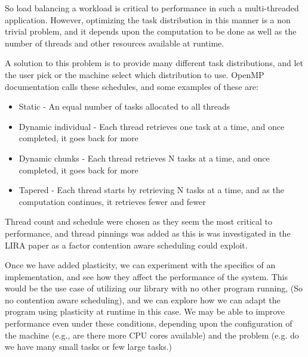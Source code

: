 So load balancing a workload is critical to performance in such a multi-threaded application. However, optimizing the task distribution in this manner is a non trivial problem, and it depends upon the computation to be done as well as the number of threads and other resources available at runtime.

A solution to this problem is to provide many different task distributions, and let the user pick or the machine select which distribution to use. OpenMP documentation calls these schedules, and some examples of these are:

\begin{itemize}
	\item Static - An equal number of tasks allocated to all threads
	\item Dynamic individual - Each thread retrieves one task at a time, and once completed, it goes back for more
	\item Dynamic chunks - Each thread retrieves N tasks at a time, and once completed, it goes back for more
	\item Tapered - Each thread starts by retrieving N tasks at a time, and as the computation continues, it retrieves fewer and fewer
\end{itemize}

Thread count and schedule were chosen as they seem the most critical to performance, and thread pinnings was added as this is was investigated in the LIRA paper \cite{lira} as a factor contention aware scheduling could exploit.

Once we have added plasticity, we can experiment with the specifics of an implementation, and see how they affect the performance of the system. This would be the use case of utilizing our library with no other program running, (So no contention aware scheduling), and we can explore how we can adapt the program using plasticity at runtime in this case. We may be able to improve performance even under these conditions, depending upon the configuration of the machine (e.g., are there more CPU cores available) and the problem (e.g. do we have many small tasks or few large tasks.) 



